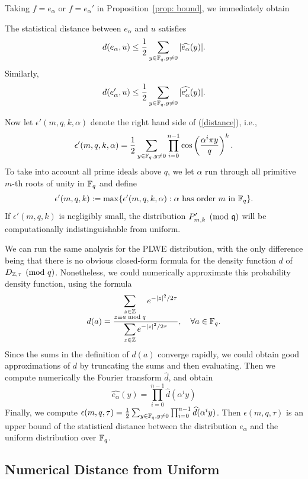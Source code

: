 \documentclass[envcountsame]{llncs}
\begin{document}
Taking $f = e_\alpha$ or $f = e_\alpha'$ in Proposition~\ref{prop: bound}, we immediately obtain
\begin{theorem} \label{cor: stat dist}
The statistical distance between $e_\alpha$ and $u$ satisfies $$d(e_\alpha,u) \leq \frac{1}{2}  \sum_{y \in \mathbb{F}_q, y \neq 0}  |\widehat{e_\alpha}(y)|.$$
Similarly,
\begin{equation} \label{distance}
d(e_\alpha',u) \leq \frac{1}{2}  \sum_{y \in \mathbb{F}_q, y \neq 0}  |\widehat{e'_\alpha}(y)|.
\end{equation}
\end{theorem}



Now let $\epsilon'(m,q,k,\alpha)$ denote the right hand side of (\ref{distance}), i.e.,
\[
    \epsilon'(m,q,k, \alpha) = \frac{1}{2}\sum_{y \in \mathbb{F}_q, y \neq 0} \prod_{i=0}^{n-1} \cos \left(\frac{ \alpha^i \pi y}{q} \right)^k.
\]
To take into account all prime ideals above $q$, we let $\alpha$ run through all primitive $m$-th roots of unity in $\mathbb{F}_q$ and define
$$\epsilon'(m,q,k) := \max \{\epsilon'(m,q,k,\alpha): \alpha \mbox{ has order } m \mbox{ in } \mathbb{F}_q\}.$$
If $\epsilon'(m,q,k)$ is negligibly small, the distribution $P'_{m,k} \pmod {\mathfrak{q}}$ will be computationally indistinguishable from uniform.

We can run the same analysis for the PLWE distribution, with the only difference being that there is no obvious closed-form formula for the density function $d$  of $D_{\mathbb{Z},\tau} \pmod{q}$. Nonetheless, we could numerically approximate this probability density function, using the formula
\[
        d(a)  = \frac{\displaystyle{\sum_{\substack{z \in \mathbb{Z}\\ z \equiv a\bmod{q}}} e^{-|z|^2/2\tau}}}{\displaystyle{\sum_{z \in \mathbb{Z}} e^{-|z|^2/2\tau}}}, \quad \forall a \in \mathbb{F}_q.
\]
Since the sums in the definition of $d(a)$ converge rapidly, we could obtain good approximations of $d$ by truncating the sums and then evaluating. Then we compute numerically the Fourier transform $\hat{d}$, and obtain
\[
    \widehat{e_\alpha}(y) = \prod_{i=0}^{n-1} \hat{d}(\alpha^i y)
\]
Finally, we compute $\epsilon(m,q,\tau) = \frac{1}{2} \sum_{y \in \mathbb{F}_q, y \neq 0} \prod_{i=0}^{n-1} \widehat{d}(\alpha^i y)$. Then $\epsilon(m,q,\tau)$ is an upper bound of the statistical distance  between the distribution $e_\alpha$ and the uniform distribution over $\mathbb{F}_q$.

\subsection{Numerical Distance from Uniform}
\end{document}
